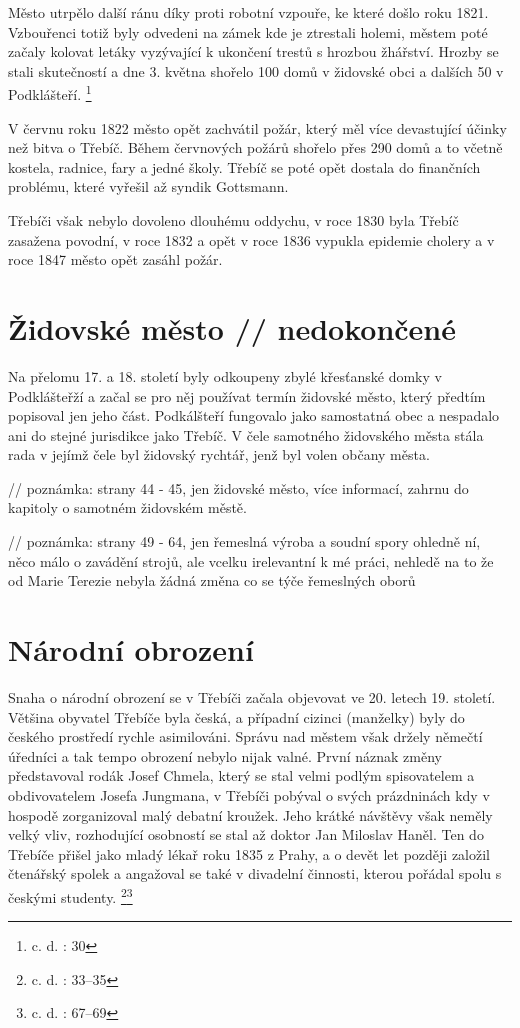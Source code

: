 \documentclass[a4paper,oneside,12p]{report}
\begin{document}
Město utrpělo další ránu díky proti robotní vzpouře, ke které došlo roku 1821.
Vzbouřenci totiž byly odvedeni na zámek kde je ztrestali holemi, městem poté začaly kolovat letáky vyzývající k ukončení trestů s hrozbou žhářství.
Hrozby se stali skutečností a dne 3. května shořelo 100 domů v židovské obci a dalších 50 v Podklášteří. \footnote{c. d. : 30}

V červnu roku 1822 město opět zachvátil požár, který měl více devastující účinky než bitva o Třebíč.
Během červnových požárů shořelo přes 290 domů a to včetně kostela, radnice, fary a jedné školy.
Třebíč se poté opět dostala do finančních problému, které vyřešil až syndik Gottsmann.

Třebíči však nebylo dovoleno dlouhému oddychu, v roce 1830 byla Třebíč zasažena povodní, v roce 1832 a opět v roce 1836 vypukla epidemie cholery a v roce 1847 město opět zasáhl požár.

\section{Židovské město // nedokončené}

Na přelomu 17. a 18. století byly odkoupeny zbylé křesťanské domky v Podklášteřží a začal se pro něj používat termín židovské město, který předtím popisoval jen jeho část.
Podkálšteří fungovalo jako samostatná obec a nespadalo ani do stejné jurisdikce jako Třebíč.
V čele samotného židovského města stála rada v jejímž čele byl židovský rychtář, jenž byl volen občany města.

// poznámka: strany 44 - 45, jen židovské město, více informací, zahrnu do kapitoly o samotném židovském městě.


// poznámka: strany 49 - 64, jen řemeslná výroba a soudní spory ohledně ní, něco málo o zavádění strojů, ale vcelku irelevantní k mé práci, nehledě na to že od Marie Terezie nebyla žádná změna co se týče řemeslných oborů

\section{Národní obrození}
Snaha o národní obrození se v Třebíči začala objevovat ve 20. letech 19. století.
Většina obyvatel Třebíče byla česká, a případní cizinci (manželky) byly do českého prostředí rychle asimilováni.
Správu nad městem však držely němečtí úředníci a tak tempo obrození nebylo nijak valné.
První náznak změny představoval rodák Josef Chmela, který se stal velmi podlým spisovatelem a obdivovatelem Josefa Jungmana, v Třebíči pobýval o svých prázdninách kdy v hospodě zorganizoval malý debatní kroužek.
Jeho krátké návštěvy však neměly velký vliv, rozhodující osobností se stal až doktor Jan Miloslav Haněl.
Ten do Třebíče přišel jako mladý lékař roku 1835 z Prahy, a o devět let později založil čtenářský spolek a angažoval se také v divadelní činnosti, kterou pořádal spolu s českými studenty. \footnote{c. d. : 33--35}\footnote{c. d. : 67--69}
\end{document}
